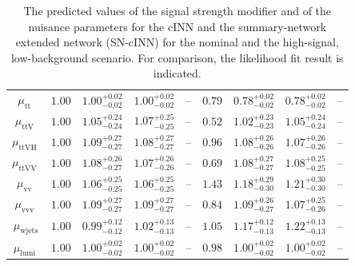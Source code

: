 \begin{table}[h!]
\begin{tabular}{ccccccccc}
		$\mu_\text{tt   } $ & $1.00$ & $1.00^{+0.02}_{-0.02}$ & $1.00^{+0.02}_{-0.02}$ & --                        & $0.79 $ & $0.78^{+0.02}_{-0.02}$  & $0.78^{+0.02}_{-0.02}$  & -- \\[0.3em]
		$\mu_\text{ttV  } $ & $1.00$ & $1.05^{+0.24}_{-0.24}$ & $1.07^{+0.25}_{-0.25}$ & --                        & $0.52 $ & $1.02^{+0.23}_{-0.23}$  & $1.05^{+0.24}_{-0.24}$  & -- \\[0.3em]
		$\mu_\text{ttVH } $ & $1.00$ & $1.09^{+0.27}_{-0.27}$ & $1.08^{+0.27}_{-0.27}$ & --                        & $0.96 $ & $1.08^{+0.26}_{-0.26}$  & $1.07^{+0.26}_{-0.26}$  & -- \\[0.3em]
		$\mu_\text{ttVV } $ & $1.00$ & $1.08^{+0.26}_{-0.27}$ & $1.07^{+0.26}_{-0.26}$ & --                        & $0.69 $ & $1.08^{+0.27}_{-0.27}$  & $1.08^{+0.25}_{-0.25}$  & -- \\[0.3em]
		$\mu_\text{vv   } $ & $1.00$ & $1.06^{+0.25}_{-0.25}$ & $1.06^{+0.25}_{-0.25}$ & --                        & $1.43 $ & $1.18^{+0.29}_{-0.30}$  & $1.21^{+0.30}_{-0.30}$  & -- \\[0.3em]
		$\mu_\text{vvv  } $ & $1.00$ & $1.09^{+0.27}_{-0.27}$ & $1.09^{+0.27}_{-0.27}$ & --                        & $0.84 $ & $1.09^{+0.26}_{-0.27}$  & $1.07^{+0.25}_{-0.26}$  & -- \\[0.3em]
		$\mu_\text{wjets} $ & $1.00$ & $0.99^{+0.12}_{-0.12}$ & $1.02^{+0.13}_{-0.13}$ & --                        & $1.05 $ & $1.17^{+0.12}_{-0.13}$  & $1.22^{+0.13}_{-0.13}$  & -- \\[0.3em]
		$\mu_\text{lumi } $ & $1.00$ & $1.00^{+0.02}_{-0.02}$ & $1.00^{+0.02}_{-0.02}$ & --                        & $0.98 $ & $1.00^{+0.02}_{-0.02}$  & $1.00^{+0.02}_{-0.02}$  & -- \\[0.3em]
		\hline
	\end{tabular}
	\caption{The predicted values of the signal strength modifier and of the nuisance parameters for the cINN and the summary-network extended network (SN-cINN) for the nominal and the high-signal, low-background scenario. For comparison, the likelihood fit result is indicated.}
	\label{tab:inference_res}
\end{table}

